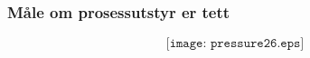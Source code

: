 \documentclass[aspectratio=169,xcolor=dvipsnames]{beamer}
\begin{document}
%
%
%
%
%
%
%
%
%
%
%
%
%
\begin{frame}
	\frametitle{Måle om prosessutstyr er tett}

	$$\texttt{[image: pressure26.eps]}$$
\end{frame}
\end{document}

